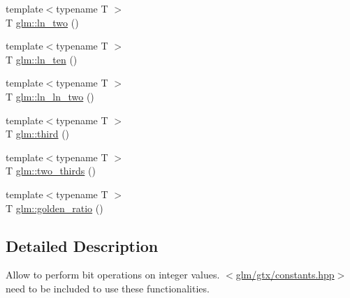 \begin{DoxyCompactItemize}
{\footnotesize template$<$typename T $>$ }\\\-T \hyperlink{group__gtx__constants_ga945cd734aac0ea15e2b3e18ff4a1d729}{glm\-::ln\-\_\-two} ()
\item 
{\footnotesize template$<$typename T $>$ }\\\-T \hyperlink{group__gtx__constants_ga7d986c61cc187475b1f33b031290aa9c}{glm\-::ln\-\_\-ten} ()
\item 
{\footnotesize template$<$typename T $>$ }\\\-T \hyperlink{group__gtx__constants_gada8ef9ab3605a4ce354e2fcc2abc3dc4}{glm\-::ln\-\_\-ln\-\_\-two} ()
\item 
{\footnotesize template$<$typename T $>$ }\\\-T \hyperlink{group__gtx__constants_gaf502fffabf5ab36d07c6c88123385b0b}{glm\-::third} ()
\item 
{\footnotesize template$<$typename T $>$ }\\\-T \hyperlink{group__gtx__constants_ga733f4fe089cba8f40ac0549928f88a51}{glm\-::two\-\_\-thirds} ()
\item 
{\footnotesize template$<$typename T $>$ }\\\-T \hyperlink{group__gtx__constants_gad32becbaf13758b9a2b3c985937254fe}{glm\-::golden\-\_\-ratio} ()
\end{DoxyCompactItemize}


\subsection{\-Detailed \-Description}
\-Allow to perform bit operations on integer values. $<$\hyperlink{constants_8hpp}{glm/gtx/constants.\-hpp}$>$ need to be included to use these functionalities. 

